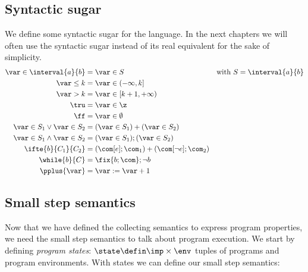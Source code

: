\subsection{Syntactic sugar}\label{sub:sugar}
We define some syntactic sugar for the language. In the next chapters
we will often use the syntactic sugar instead of its real equivalent
for the sake of simplicity.
\begin{align*}
  \var \in \interval{a}{b} & = \var \in S & \text{with } S = \interval{a}{b}\\
  \var \leq k & = \var \in (-\infty, k]\\
  \var > k & = \var \in [k+1, + \infty) \\
  \tru & = \var \in \z \\
  \ff & = \var \in \emptyset \\
  \var \in S_1 \vee \var \in S_2 & = (\var \in S_1) + (\var \in S_2) \\ 
  \var \in S_1 \wedge \var \in S_2 & = (\var \in S_1);(\var \in S_2) \\
  \ifte{b}{C_1}{C_2} & = (\com[e];\com_1) + (\com[\neg e];\com_2) \\
  \while{b}{C} & = \fix{b;\com};\neg b \\
  \pplus{\var} & = \var := \var + 1
\end{align*}

\subsection{Small step semantics}\label{sub:sos}

Now that we have defined the collecting semantics to express program
properties, we need the small step semantics to talk about program
execution. We start by defining \emph{program states}:
\(\state \defin \imp \times \env\) tuples of programs and program
environments.  With states we can define our small step semantics:

